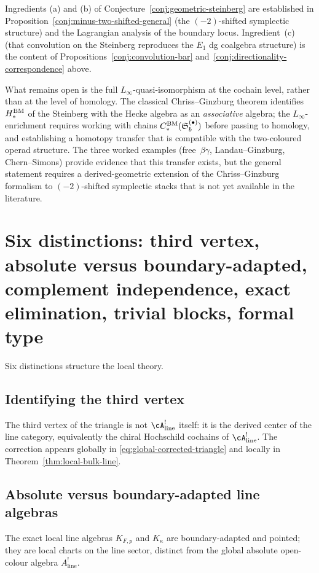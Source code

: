\begin{remark}
Ingredients (a) and (b) of Conjecture~\ref{conj:geometric-steinberg}
are established in Proposition~\ref{conj:minus-two-shifted-general}
(the $(-2)$-shifted symplectic structure) and the Lagrangian
analysis of the boundary locus. Ingredient~(c) (that convolution
on the Steinberg reproduces the $E_1$ dg coalgebra structure) is the
content of
Propositions~\ref{conj:convolution-bar}
and~\ref{conj:directionality-correspondence} above.

What remains open is the full $L_\infty$-quasi-isomorphism at the
cochain level, rather than at the level of homology. The classical
Chriss--Ginzburg theorem identifies $H_*^{\mathrm{BM}}$ of the Steinberg
with the Hecke algebra as an \emph{associative} algebra; the
$L_\infty$-enrichment requires working with chains
$C_*^{\mathrm{BM}}(\mathfrak{S}_b^{(\bullet)})$ before passing to homology,
and establishing a homotopy transfer that is compatible with the
two-coloured operad structure. The three worked examples
(free~$\beta\gamma$, Landau--Ginzburg, Chern--Simons) provide
evidence that this transfer exists, but the general statement
requires a derived-geometric extension of the Chriss--Ginzburg
formalism to $(-2)$-shifted symplectic stacks that is not yet
available in the literature.
\end{remark}


\section{Six distinctions: third vertex, absolute versus boundary-adapted, complement independence, exact elimination, trivial blocks, formal type}

Six distinctions structure the local theory.

\subsection*{Identifying the third vertex}
The third vertex of the triangle is not $\cA^!_{\mathrm{line}}$ itself: it is the derived center of the line category, equivalently the chiral Hochschild cochains of $\cA^!_{\mathrm{line}}$. The correction appears globally in \eqref{eq:global-corrected-triangle} and locally in Theorem~\ref{thm:local-bulk-line}.

\subsection*{Absolute versus boundary-adapted line algebras}
The exact local line algebras $K_{F,p}$ and $K_\kappa$ are boundary-adapted and pointed; they are local charts on the line sector, distinct from the global absolute open-colour algebra $A^!_{\mathrm{line}}$.

